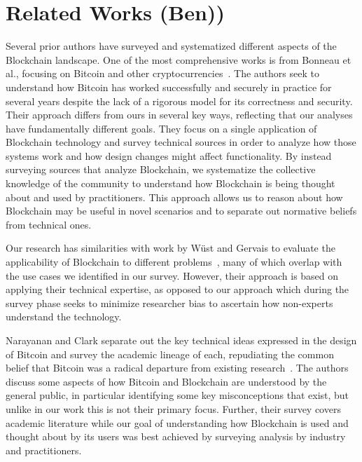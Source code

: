 
\section{Related Works (Ben))}
Several prior authors have surveyed and systematized different aspects of the Blockchain landscape.
One of the most comprehensive works is from Bonneau et al., focusing on Bitcoin and other cryptocurrencies~\cite{BMC+15}. The authors seek to understand how Bitcoin has worked successfully and securely in practice for several years despite the lack of a rigorous model for its correctness and security. %
Their approach differs from ours in several key ways, reflecting that our analyses have fundamentally different goals. They focus on a single application of Blockchain technology and survey technical sources in order to analyze how those systems work and how design changes might affect functionality. By instead surveying sources that analyze Blockchain, we systematize the collective knowledge of the community to understand how Blockchain is being thought about and used by practitioners. This approach allows us to reason about how Blockchain may be useful in novel scenarios and to separate out normative beliefs from technical ones. 

Our research has similarities with work by W{\"u}st and Gervais to evaluate the applicability of Blockchain to different problems~\cite{Wust17}, many of which overlap with the use cases we identified in our survey. However, their approach is based on applying their technical expertise, as opposed to our approach which during the survey phase seeks to minimize researcher bias to ascertain how non-experts understand the technology.

Narayanan and Clark separate out the key technical ideas expressed in the design of Bitcoin and survey the academic lineage of each, repudiating the common belief that Bitcoin was a radical departure from existing research~\cite{Narayanan17}. The authors discuss some aspects of how Bitcoin and Blockchain are understood by the general public, in particular identifying some key misconceptions that exist, but unlike in our work this is not their primary focus. Further, their survey covers academic literature while our goal of understanding how Blockchain is used and thought about by its users was best achieved by surveying analysis by industry and practitioners.

